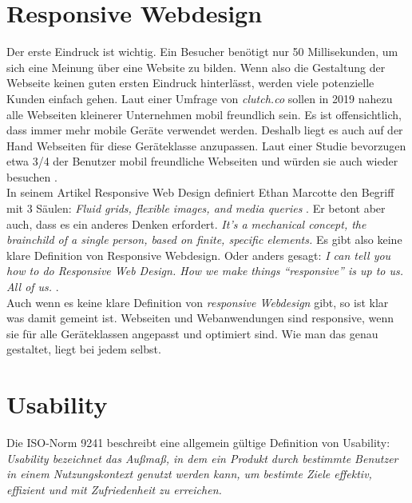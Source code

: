 \section{Responsive Webdesign}
\label{sec:responsive}
%
Der erste Eindruck ist wichtig. Ein Besucher benötigt nur 50 Millisekunden, um sich eine Meinung über eine Website zu bilden. Wenn also die Gestaltung der Webseite keinen guten ersten Eindruck hinterlässt, werden viele potenzielle Kunden einfach gehen\cite{webalive}. Laut einer Umfrage von \textit{clutch.co} sollen in 2019 nahezu alle Webseiten kleinerer Unternehmen mobil freundlich sein. Es ist offensichtlich, dass immer mehr mobile Geräte verwendet werden. Deshalb liegt es auch auf der Hand Webseiten für diese Geräteklasse anzupassen.
Laut einer Studie bevorzugen etwa 3/4 der Benutzer mobil freundliche Webseiten und würden sie auch wieder besuchen \cite{searchenginewatch}.\\
In seinem Artikel Responsive Web Design definiert Ethan Marcotte den Begriff mit 3 Säulen:
\textit{\glqq Fluid grids, flexible images, and media queries\grqq } \cite{marcotte_responsive_2010}.
Er betont aber auch, dass es ein anderes Denken erfordert. \textit{\glqq It’s a mechanical concept, the brainchild of a single person, based on finite, specific elements.\grqq} \cite{gardner_what_2014} Es gibt also keine klare Definition von Responsive Webdesign. Oder anders gesagt:
 \textit{\glqq I can tell you how to do Responsive Web Design. How we make things “responsive” is up to us. All of us.\grqq} \cite{gardner_what_2014}. \\
Auch wenn es keine klare Definition von \textit{responsive Webdesign} gibt, so ist klar was damit gemeint ist. Webseiten und Webanwendungen sind responsive, wenn sie für alle Geräteklassen angepasst und optimiert sind. Wie man das genau gestaltet, liegt bei jedem selbst.
%
%
%
%
%
\section{Usability}
\label{sec:usability}
%
Die ISO-Norm 9241 beschreibt eine allgemein gültige Definition von Usability:\\

\textit{\glqq Usability bezeichnet das Außmaß, in dem ein Produkt durch bestimmte Benutzer in einem Nutzungskontext genutzt werden kann, um bestimte Ziele effektiv, effizient und mit Zufriedenheit zu erreichen.\grqq} \cite{din-en-iso-9241-210_ergonomie_2010}\\

